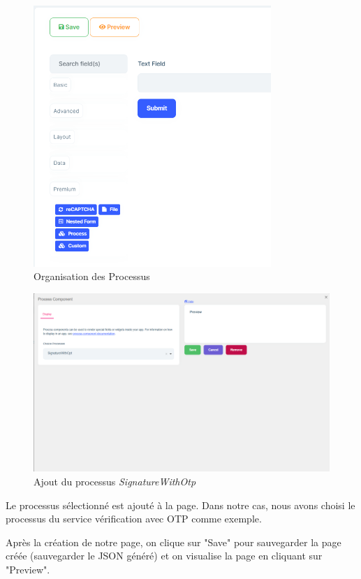\begin{enumerate}
          \begin{figure}[H]
              \centering
              \includegraphics[width=9cm]{Figures/process 1.PNG}
              \caption{Organisation des Processus}
          \end{figure}
          \begin{figure}[H]
              \centering
              \includegraphics[width=17cm]{Figures/process 2.PNG}
              \caption{Ajout du processus \textit{SignatureWithOtp}}
          \end{figure}

          Le processus sélectionné est ajouté à la page. Dans notre cas, nous avons choisi le processus du service vérification avec OTP comme exemple.

          Après la création de notre page, on clique sur "Save" pour sauvegarder la page créée (sauvegarder le JSON généré) et on visualise la page en cliquant sur "Preview".



\end{enumerate}
